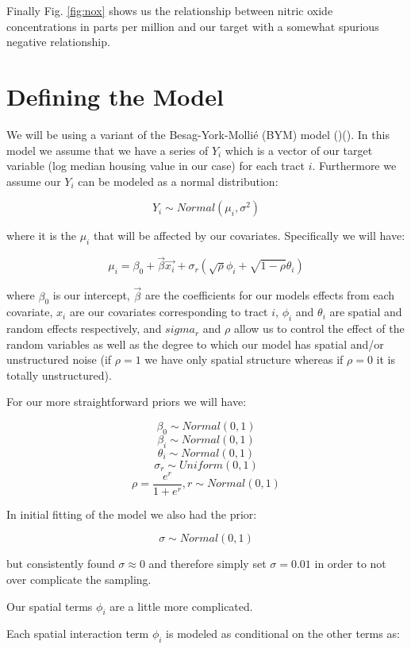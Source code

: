 \documentclass[11pt]{article}
\begin{document}
Finally Fig. \ref{fig:nox} shows us the relationship between nitric oxide concentrations in parts per million and our target with a somewhat spurious negative relationship. 


\section{Defining the Model}

We will be using a variant of the Besag-York-Mollié (BYM) model (\cite{book})(\cite{bymstan}). In this model we assume that we have a series of $Y_i$ which is a vector of our target variable (log median housing value in our case) for each tract $i$. Furthermore we assume our $Y_i$ can be modeled as a normal distribution:

$$Y_i \sim Normal(\mu_i, \sigma^2)$$

where it is the $\mu_i$ that will be affected by our covariates. Specifically we will have:

$$\mu_i= \beta_0 + \vec{\beta} \vec{x_i} + \sigma_r\left( \sqrt{\rho}\phi_i + \sqrt{1-\rho}\theta_i \right)$$

where $\beta_0$ is our intercept, $\vec{\beta}$ are the coefficients for our models effects from each covariate, $x_i$ are our covariates corresponding to tract $i$, $\phi_i$ and $\theta_i$ are spatial and random effects respectively, and $sigma_r$ and $\rho$ allow us to control the effect of the random variables as well as the degree to which our model has spatial and/or unstructured noise (if $\rho=1$ we have only spatial structure whereas if $\rho=0$ it is totally unstructured). 

For our more straightforward priors we will have:

$$\beta_0 \sim Normal(0,1)$$
$$\beta_i \sim Normal(0,1)$$
$$\theta_i \sim Normal(0,1)$$
$$\sigma_r \sim Uniform(0,1)$$
$$\rho = \frac{e^{r}}{1 + e^{r}}, r\sim Normal(0,1)$$

In initial fitting of the model we also had the prior:


$$\sigma \sim Normal(0,1)$$

but consistently found $\sigma \approx 0$ and therefore simply set $\sigma=0.01$ in order to not over complicate the sampling. 

Our spatial terms $\phi_i$ are a little more complicated. \newline

Each spatial interaction term $\phi_i$ is modeled as conditional on the other terms as:
\end{document}
